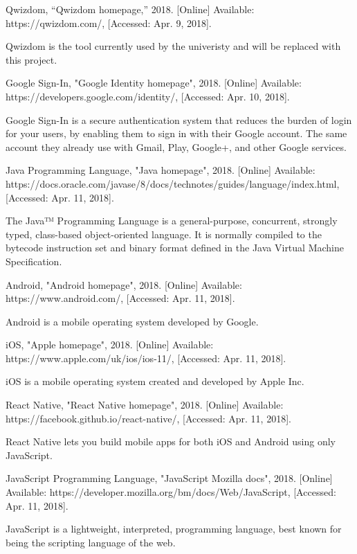 \documentclass[11pt,a4paper]{report}
\begin{document}
\begin{thebibliography}{1}

 Qwizdom, “Qwizdom homepage,” 2018. [Online] Available: https://qwizdom.com/, [Accessed: Apr. 9, 2018].

  Qwizdom is the tool currently used by the univeristy and will be replaced with this project.

 Google Sign-In, "Google Identity homepage", 2018. [Online] Available: https://developers.google.com/identity/, [Accessed: Apr. 10, 2018].

  Google Sign-In is a secure authentication system that reduces the burden of login for your users, by enabling them
  to sign in with their Google account. The same account they already use with Gmail, Play, Google+, and other Google services.

 Java Programming Language, "Java homepage", 2018. [Online] Available:
  https://docs.oracle.com/javase/8/docs/technotes/guides/language/index.html, [Accessed: Apr. 11, 2018].

  The Java™ Programming Language is a general-purpose, concurrent, strongly typed, class-based object-oriented language.
  It is normally compiled to the bytecode instruction set and binary format defined in the Java Virtual Machine Specification.

 Android, "Android homepage", 2018. [Online] Available: https://www.android.com/, [Accessed: Apr. 11, 2018].

  Android is a mobile operating system developed by Google.

 iOS, "Apple homepage", 2018. [Online] Available: https://www.apple.com/uk/ios/ios-11/, [Accessed: Apr. 11, 2018].

  iOS is a mobile operating system created and developed by Apple Inc.

 React Native, "React Native homepage", 2018. [Online] Available: https://facebook.github.io/react-native/, [Accessed: Apr. 11, 2018].

  React Native lets you build mobile apps for both iOS and Android using only JavaScript.

 JavaScript Programming Language, "JavaScript Mozilla docs", 2018. [Online]
  Available: https://developer.mozilla.org/bm/docs/Web/JavaScript, [Accessed: Apr. 11, 2018].

  JavaScript is a lightweight, interpreted, programming language, best known for being the scripting
  language of the web.


\end{thebibliography}
\end{document}
